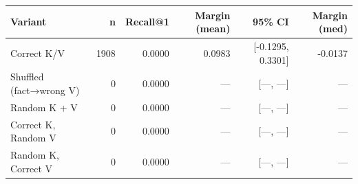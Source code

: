 \begin{tabular}{l r r r r r}
\toprule
Variant & n & Recall@1 & Margin (mean) & 95\% CI & Margin (med) \\  %
\midrule
Correct K/V & 1908 & 0.0000 & 0.0983 & [-0.1295, 0.3301] & -0.0137 \\
Shuffled (fact→wrong V) & 0 & 0.0000 & — & [—, —] & — \\
Random K + V & 0 & 0.0000 & — & [—, —] & — \\
Correct K, Random V & 0 & 0.0000 & — & [—, —] & — \\
Random K, Correct V & 0 & 0.0000 & — & [—, —] & — \\
\bottomrule
\end{tabular}
